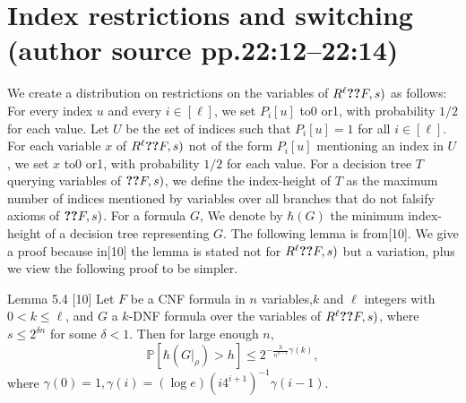 \section*{Index restrictions and switching (author source pp.22:12--22:14)}
We create a distribution on restrictions on the variables of $R^\ell\Ref(F,s)$ as follows: For every index $u$ and every $i\in[\ell]$, we set $P_i[u]$ to0 or1, with probability $1/2$ for each value. Let $U$ be the set of indices such that $P_i[u]=1$ for all $i\in[\ell]$. For each variable $x$ of $R^\ell\Ref(F,s)$ not of the form $P_i[u]$ mentioning an index in $U$, we set $x$ to0 or1, with probability $1/2$ for each value.
For a decision tree $T$ querying variables of $\Ref(F,s)$, we define the index-height of $T$ as the maximum number of indices mentioned by variables over all branches that do not falsify axioms of $\Ref(F,s)$. For a formula $G$, We denote by $\hbar(G)$ the minimum index-height of a decision tree representing $G$.
The following lemma is from[10]. We give a proof because in[10] the lemma is stated not for $R^\ell\Ref(F,s)$ but a variation, plus we view the following proof to be simpler.
\begin{originalresult}{Lemma 5.4 [10]}
Let $F$ be a CNF formula in $n$ variables,$k$ and $\ell$ integers with $0<k\le\ell$, and $G$ a $k$-DNF formula over the variables of $R^\ell\Ref(F,s)$, where $s\le2^{\delta n}$ for some $\delta<1$. Then for large enough $n$,
\[\mathbb P[\hbar(G|_\rho)>h]\le2^{-\frac h{n^{k-1}}\gamma(k)},\]
where $\gamma(0)=1,\gamma(i)=(\log e)(i4^{i+1})^{-1}\gamma(i-1)$.
\end{originalresult}
